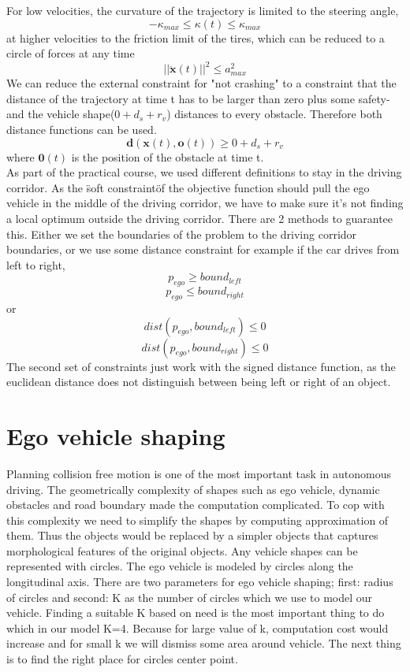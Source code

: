 \documentclass[conference]{IEEEtran}
\begin{document}
For low velocities, the curvature of the trajectory is limited to the steering angle,
$$ -\kappa_{max} \leq \kappa (t) \leq \kappa_{max}$$
at higher velocities to the friction limit of the tires, which can be reduced to a circle of forces at any time
$$
||\mathbf{\ddot{x}}(t)||^2 \leq a_{max}^2
$$
We can reduce the external constraint for "not crashing" to a constraint that the distance of the trajectory at time t has to be larger than zero plus some safety- and the vehicle shape($0+ d_s+ r_v $) distances to every obstacle. Therefore both distance functions can be used.
$$
\mathbf{d}(\mathbf{x}(t),\mathbf{o}(t)) \geq 0+ d_s + r_v$$
where $\mathbf{0}(t) $ is the position of the obstacle at time t.\\
As part of the practical course, we used different definitions to stay in the driving corridor. As the \"soft constraint\" of the objective function should pull the ego vehicle in the middle of the driving corridor, we have to make sure it's not finding a local optimum outside the driving corridor. There are 2 methods to guarantee this. Either we set the boundaries of the problem to the driving corridor boundaries, or we use some distance constraint for example if the car drives from left to right,
$$ p_{ego} \geq bound_{left}$$
$$ p_{ego} \leq bound_{right}$$
or 
$$ dist(p_{ego},bound_{left}) \leq 0 $$
$$ dist(p_{ego},bound_{right}) \leq 0 $$
The second set of constraints just work with the signed distance function, as the euclidean distance does not distinguish between being left or right of an object.
\section{Ego vehicle shaping}
Planning collision free motion is one of the most important task in autonomous driving. The geometrically complexity of shapes such as ego vehicle, dynamic obstacles and road boundary made the computation complicated. To cop with this complexity we need to simplify the shapes by computing approximation of them. Thus the objects would be replaced by a simpler objects that captures morphological features of the original objects.
Any vehicle shapes can be represented with circles. The ego vehicle is modeled by circles along the longitudinal axis. There are two parameters for ego vehicle shaping; first: radius of circles and second: K as the number of circles which we use to model our vehicle. Finding a suitable K based on need is the most important thing to do which in our model K=4. Because for large value of k, computation cost would increase and for small k we will dismiss some area around vehicle. The next thing is to find the right place for circles center point.
\end{document}
